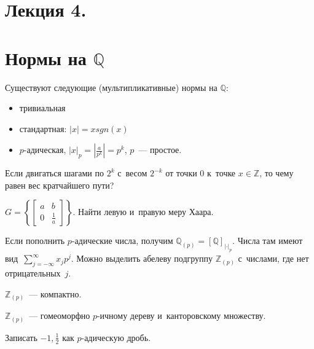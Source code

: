 \documentclass{article}
\begin{document}
\section*{Лекция 4. }
\resetcntrs

\section{Нормы на $\mathbb{Q}$}

\begin{theorem}
	Существуют следующие (мультипликативные) нормы на $\mathbb{Q}$:
	\begin{itemize}
		\item тривиальная
		\item стандартная: $|x| = x sgn(x)$
		\item $p$-адическая, $|x|_p = |\frac{a}{p^k}| = p^k$, $p$~--- простое.
	\end{itemize}
\end{theorem}

\begin{exercise}
	Если двигаться шагами по $2^k$ с~весом $2^{-k}$ от точки 0 к~точке $x \in
	\mathbb{Z}$, то чему равен вес кратчайшего пути?
\end{exercise}

\begin{exercise}
	$G = \left\{ \begin{bmatrix}a & b\\0 & \frac{1}{a}\end{bmatrix} \right\}$.
	Найти левую и~правую меру Хаара.
\end{exercise}

Если пополнить $p$-адические числа, получим $\mathbb{Q}_{(p)} =
[\mathbb{Q}]_{|\cdot|_p}$. Числа там имеют вид~$\sum\limits_{j=-\infty}^{\infty}
x_j p^j$. Можно выделить абелеву подгруппу $\mathbb{Z}_{(p)}$ с~числами, где нет
отрицательных~$j$.

\begin{exercise}
	$\mathbb{Z}_{(p)}$~--- компактно.
\end{exercise}

\begin{exercise}
	$\mathbb{Z}_{(p)}$~--- гомеоморфно $p$-ичному дереву и~канторовскому множеству.
\end{exercise}

\begin{exercise}
	Записать $-1, \frac{1}{2}$ как $p$-адическую дробь.
\end{exercise}
\end{document}
